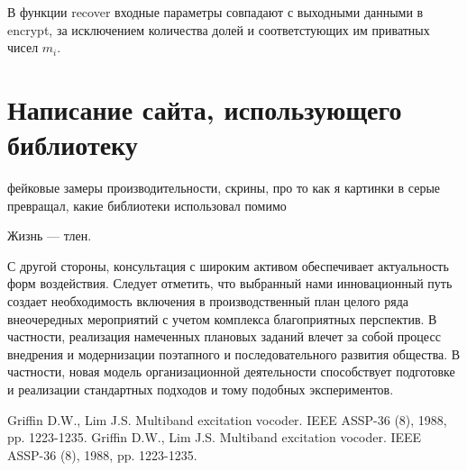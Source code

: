 \documentclass[a4paper,article,14pt]{extarticle}
\begin{document}
В функции recover входные параметры совпадают с выходными данными в encrypt, за исключением количества долей и соответстующих им 
приватных чисел $m_i$.


\newpage
\section{Написание сайта, использующего библиотеку}

фейковые замеры производительности, скрины, про то как я картинки в серые превращал, какие библиотеки использовал помимо


\newpage
{}
Жизнь --- тлен.
\pagebreak


С другой стороны, консультация с широким активом обеспечивает актуальность форм воздействия. Следует отметить, что выбранный нами инновационный путь создает необходимость включения в производственный план целого ряда внеочередных мероприятий с учетом комплекса благоприятных перспектив. В частности, реализация намеченных плановых заданий влечет за собой процесс внедрения и модернизации поэтапного и последовательного развития общества. В частности, новая модель организационной деятельности способствует подготовке и реализации стандартных подходов и тому подобных экспериментов.

\newpage    
\begin{thebibliography}{1}
 Griffin D.W., Lim J.S. \flqq Multiband excitation vocoder\frqq. IEEE ASSP-36 (8), 1988, pp. 1223-1235.
 Griffin D.W., Lim J.S. \flqq Multiband excitation vocoder\frqq. IEEE ASSP-36 (8), 1988, pp. 1223-1235.
\end{thebibliography}
\end{document}
